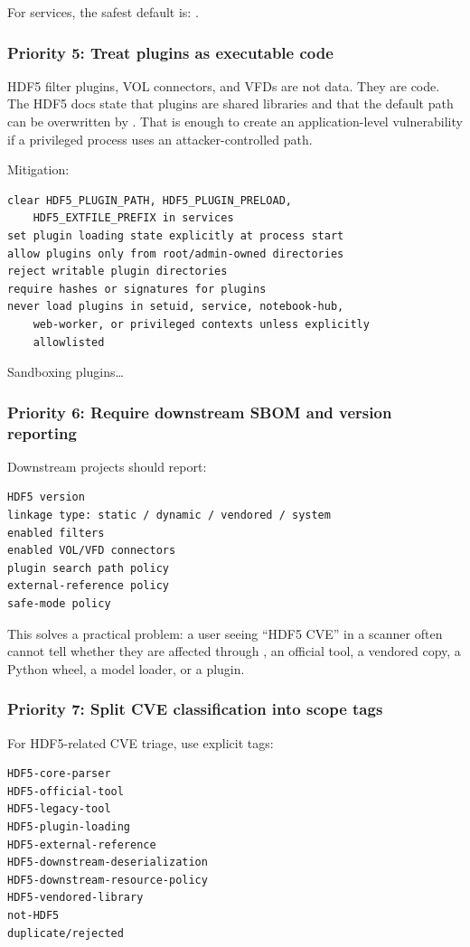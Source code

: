\documentclass[../main.tex]{subfiles}
\begin{document}
For services, the safest default is: .

\subsubsection*{Priority 5: Treat plugins as executable code}

HDF5 filter plugins, VOL connectors, and VFDs are not data.
They are code. The HDF5 docs state that plugins are shared
libraries and that the default path can be overwritten by
. That is enough to create an
application-level vulnerability if a privileged process uses an
attacker-controlled path.

Mitigation:
\begin{verbatim}
clear HDF5_PLUGIN_PATH, HDF5_PLUGIN_PRELOAD,
    HDF5_EXTFILE_PREFIX in services
set plugin loading state explicitly at process start
allow plugins only from root/admin-owned directories
reject writable plugin directories
require hashes or signatures for plugins
never load plugins in setuid, service, notebook-hub,
    web-worker, or privileged contexts unless explicitly
    allowlisted
\end{verbatim}

Sandboxing plugins\ldots

\subsubsection*{Priority 6: Require downstream SBOM and version reporting}

Downstream projects should report:
\begin{verbatim}
HDF5 version
linkage type: static / dynamic / vendored / system
enabled filters
enabled VOL/VFD connectors
plugin search path policy
external-reference policy
safe-mode policy
\end{verbatim}

This solves a practical problem: a user seeing “HDF5 CVE” in a
scanner often cannot tell whether they are affected through
, an official tool, a vendored copy, a Python wheel,
a model loader, or a plugin.

\subsubsection*{Priority 7: Split CVE classification into scope tags}

For HDF5-related CVE triage, use explicit tags:
\begin{verbatim}
HDF5-core-parser
HDF5-official-tool
HDF5-legacy-tool
HDF5-plugin-loading
HDF5-external-reference
HDF5-downstream-deserialization
HDF5-downstream-resource-policy
HDF5-vendored-library
not-HDF5
duplicate/rejected
\end{verbatim}
\end{document}
